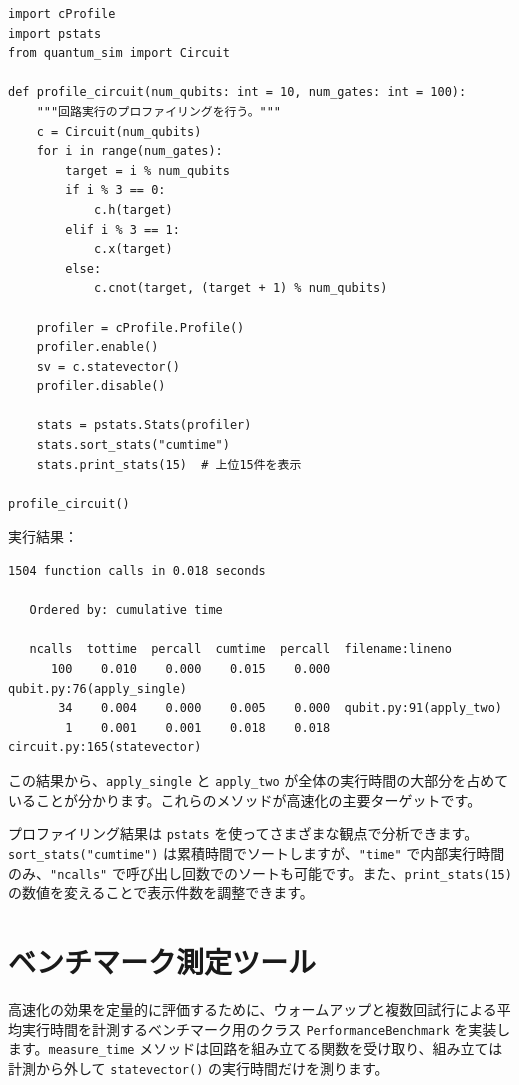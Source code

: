 \begin{lstlisting}[caption=cProfile を使ったプロファイリング（performance.py）, label=src:profiling]
import cProfile
import pstats
from quantum_sim import Circuit

def profile_circuit(num_qubits: int = 10, num_gates: int = 100):
    """回路実行のプロファイリングを行う。"""
    c = Circuit(num_qubits)
    for i in range(num_gates):
        target = i % num_qubits
        if i % 3 == 0:
            c.h(target)
        elif i % 3 == 1:
            c.x(target)
        else:
            c.cnot(target, (target + 1) % num_qubits)

    profiler = cProfile.Profile()
    profiler.enable()
    sv = c.statevector()
    profiler.disable()

    stats = pstats.Stats(profiler)
    stats.sort_stats("cumtime")
    stats.print_stats(15)  # 上位15件を表示

profile_circuit()
\end{lstlisting}

実行結果：

\begin{lstlisting}[caption=プロファイリング結果（抜粋）]
         1504 function calls in 0.018 seconds

   Ordered by: cumulative time

   ncalls  tottime  percall  cumtime  percall  filename:lineno
      100    0.010    0.000    0.015    0.000  qubit.py:76(apply_single)
       34    0.004    0.000    0.005    0.000  qubit.py:91(apply_two)
        1    0.001    0.001    0.018    0.018  circuit.py:165(statevector)
\end{lstlisting}

この結果から、\texttt{apply\_single} と \texttt{apply\_two} が全体の実行時間の大部分を占めていることが分かります。これらのメソッドが高速化の主要ターゲットです。

プロファイリング結果は \texttt{pstats} を使ってさまざまな観点で分析できます。\texttt{sort\_stats("cumtime")} は累積時間でソートしますが、\texttt{"time"} で内部実行時間のみ、\texttt{"ncalls"} で呼び出し回数でのソートも可能です。また、\texttt{print\_stats(15)} の数値を変えることで表示件数を調整できます。

\section{ベンチマーク測定ツール}

高速化の効果を定量的に評価するために、ウォームアップと複数回試行による平均実行時間を計測するベンチマーク用のクラス \texttt{PerformanceBenchmark} を実装します。\texttt{measure\_time} メソッドは回路を組み立てる関数を受け取り、組み立ては計測から外して \texttt{statevector()} の実行時間だけを測ります。

